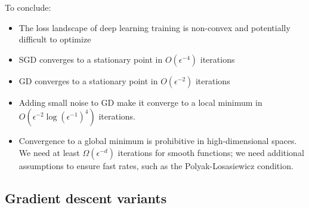 To conclude:
\begin{itemize}
    \item The loss landscape of deep learning training is non-convex and potentially difficult to optimize
    \item SGD converges to a stationary point in $O(\epsilon^{-4})$ iterations
    \item GD converges to a stationary point in $O(\epsilon^{-2})$ iterations
    \item Adding small noise to GD make it converge to a local minimum in $O(\epsilon^{-2}\log(\epsilon^{-1})^4)$ iterations.
    \item Convergence to a global minimum is prohibitive in high-dimensional spaces. We need at least $\Omega(\epsilon^{-d})$ iterations for smooth functions; we need additional assumptions to ensure fast rates, such as the Polyak-Losasiewicz condition.
\end{itemize}


\subsection{Gradient descent variants}